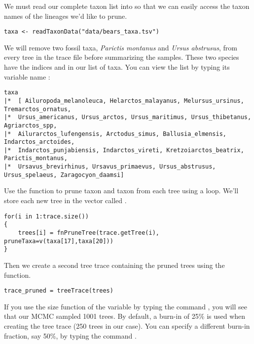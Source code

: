 We must read our complete taxon list into \RevBayes so that we can easily access the taxon names of the lineages we'd like to prune.
{\tt \begin{snugshade*}
\begin{lstlisting}
taxa <- readTaxonData("data/bears_taxa.tsv")
\end{lstlisting}
\end{snugshade*}}

We will 
remove two fossil taxa, \textit{Parictis montanus} and \textit{Ursus abstrusus}, from every tree in the trace file before summarizing the samples.
These two species have the indices  and  in our list of taxa. 
You can view the list by typing its variable name :
{\tt \begin{snugshade*}
\begin{lstlisting}
taxa 
|*  [ Ailuropoda_melanoleuca, Helarctos_malayanus, Melursus_ursinus, Tremarctos_ornatus,
|*  Ursus_americanus, Ursus_arctos, Ursus_maritimus, Ursus_thibetanus, Agriarctos_spp,
|*  Ailurarctos_lufengensis, Arctodus_simus, Ballusia_elmensis, Indarctos_arctoides,
|*  Indarctos_punjabiensis, Indarctos_vireti, Kretzoiarctos_beatrix, Parictis_montanus,
|*  Ursavus_brevirhinus, Ursavus_primaevus, Ursus_abstrusus, Ursus_spelaeus, Zaragocyon_daamsi]
\end{lstlisting}
\end{snugshade*}}

Use the  function to prune taxon  and taxon  from each tree using a  loop.
We'll store each new tree in the vector called .

{\tt \begin{snugshade*}
\begin{lstlisting}
for(i in 1:trace.size())
{
    trees[i] = fnPruneTree(trace.getTree(i), pruneTaxa=v(taxa[17],taxa[20]))
}
\end{lstlisting}
\end{snugshade*}}

Then we create a second tree trace containing the pruned trees using the  function.

{\tt \begin{snugshade*}
\begin{lstlisting}
trace_pruned = treeTrace(trees)
\end{lstlisting}
\end{snugshade*}}

If you use the size function of the  variable by typing the command \colorbox{shadecolor}{}, you will see that our MCMC sampled 1001 trees. 
By default, a burn-in of 25\% is used when creating the tree trace (250 trees in our case). You can specify a different burn-in fraction, say 50\%, by typing the command \colorbox{shadecolor}{}.

